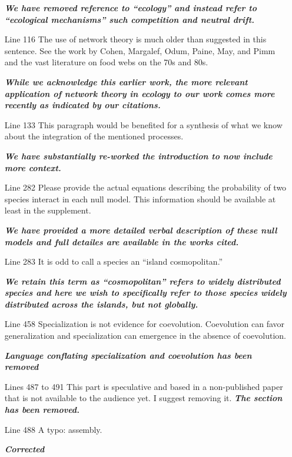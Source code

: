 \documentclass[12pt]{article}
\begin{document}
\begin{itemize}
  \textit{\textbf{We have removed reference to ``ecology'' and instead
      refer to ``ecological mechanisms'' such competition and neutral
      drift.}}
%
\item[Line 116] The use of network theory is much older than suggested
  in this sentence. See the work by Cohen, Margalef, Odum, Paine, May,
  and Pimm and the vast literature on food webs on the 70s and 80s.

  \textit{\textbf{While we acknowledge this earlier work, the more
      relevant application of network theory in ecology to our work
      comes more recently as indicated by our citations.}} 
%
\item[Line 133] This paragraph would be benefited for a synthesis of
  what we know about the integration of the mentioned processes.

  \textit{\textbf{We have substantially re-worked the introduction to
      now include more context.}}
%
\item[Line 282] Please provide the actual equations describing the
  probability of two species interact in each null model. This
  information should be available at least in the supplement.

  \textit{\textbf{We have provided a more detailed verbal description
      of these null models and full detailes are available in the
      works cited.}}
%
\item[Line 283] It is odd to call a species an ``island
  cosmopolitan.''

  \textit{\textbf{We retain this term as ``cosmopolitan'' refers to
      widely distributed species and here we wish to specifically
      refer to those species widely distributed across the islands,
      but not globally.}}
%
\item[Line 458] Specialization is not evidence for
  coevolution. Coevolution can favor generalization and specialization
  can emergence in the absence of coevolution.

  \textit{\textbf{Language conflating specialization and coevolution
      has been removed}}
%
\item[Lines 487 to 491] This part is speculative and based in a
  non-published paper that is not available to the audience yet. I
  suggest removing it.
%
\textit{\textbf{The section has been removed.}}
%
\item[Line 488] A typo: assembly.  

  \textit{\textbf{Corrected}}
\end{itemize}
\end{document}
